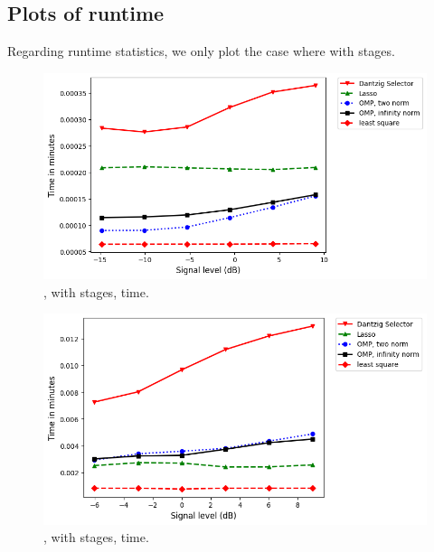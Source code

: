 \subsection {Plots of runtime}

Regarding runtime statistics, we only plot the case where  with  stages.

\begin {figure} [H]
\includegraphics [width = \textwidth] {time-small-square-two.png}
\caption {, with  stages, time.}
\end {figure}


\begin {figure} [H]
\includegraphics [width = \textwidth] {time-medium-square-two.png}
\caption {, with  stages, time.}
\end {figure}


